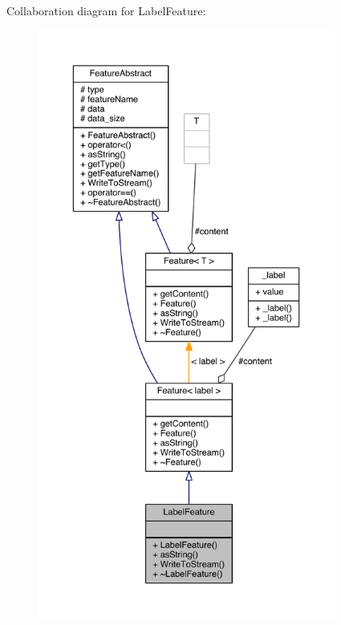 Collaboration diagram for Label\+Feature\+:
\nopagebreak
\begin{figure}[H]
\begin{center}
\leavevmode
\includegraphics[height=550pt]{class_label_feature__coll__graph}
\end{center}
\end{figure}


